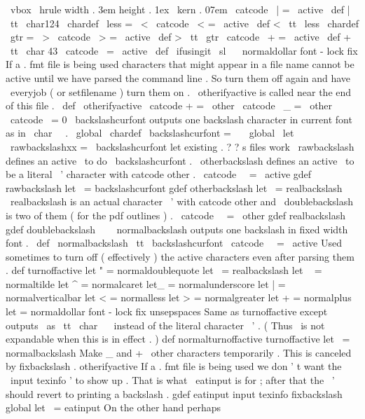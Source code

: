 {{\
vbox
{
\
hrule
width
.
3em
height
.
1ex
}
\
kern
.
07em
}
\
catcode
\
|
=
\
active
\
def
|
{
{
\
tt
\
char124
}
}
\
chardef
\
less
=
\
<
\
catcode
\
<
=
\
active
\
def
<
{
{
\
tt
\
less
}
}
\
chardef
\
gtr
=
\
>
\
catcode
\
>
=
\
active
\
def
>
{
{
\
tt
\
gtr
}
}
\
catcode
\
+
=
\
active
\
def
+
{
{
\
tt
\
char
43
}
}
\
catcode
\
=
\
active
\
def
{
\
ifusingit
{
{
\
sl
\
}
}
\
normaldollar
}
%
font
-
lock
fix
%
If
a
.
fmt
file
is
being
used
characters
that
might
appear
in
a
file
%
name
cannot
be
active
until
we
have
parsed
the
command
line
.
%
So
turn
them
off
again
and
have
\
everyjob
(
or
setfilename
)
turn
them
on
.
%
\
otherifyactive
is
called
near
the
end
of
this
file
.
\
def
\
otherifyactive
{
\
catcode
+
=
\
other
\
catcode
\
_
=
\
other
}
\
catcode
\
=
0
%
\
backslashcurfont
outputs
one
backslash
character
in
current
font
%
as
in
\
char
\
\
.
\
global
\
chardef
\
backslashcurfont
=
\
\
\
global
\
let
\
rawbackslashxx
=
\
backslashcurfont
%
let
existing
.
?
?
s
files
work
%
\
rawbackslash
defines
an
active
\
to
do
\
backslashcurfont
.
%
\
otherbackslash
defines
an
active
\
to
be
a
literal
\
'
character
with
%
catcode
other
.
{
\
catcode
\
\
=
\
active
gdef
rawbackslash
{
let
\
=
backslashcurfont
}
gdef
otherbackslash
{
let
\
=
realbackslash
}
}
%
\
realbackslash
is
an
actual
character
\
'
with
catcode
other
and
%
\
doublebackslash
is
two
of
them
(
for
the
pdf
outlines
)
.
{
\
catcode
\
\
=
\
other
gdef
realbackslash
{
\
}
gdef
doublebackslash
{
\
\
}
}
%
\
normalbackslash
outputs
one
backslash
in
fixed
width
font
.
\
def
\
normalbackslash
{
{
\
tt
\
backslashcurfont
}
}
\
catcode
\
\
=
\
active
%
Used
sometimes
to
turn
off
(
effectively
)
the
active
characters
%
even
after
parsing
them
.
def
turnoffactive
{
%
let
"
=
normaldoublequote
let
\
=
realbackslash
let
~
=
normaltilde
let
^
=
normalcaret
let_
=
normalunderscore
let
|
=
normalverticalbar
let
<
=
normalless
let
>
=
normalgreater
let
+
=
normalplus
let
=
normaldollar
%
font
-
lock
fix
unsepspaces
}
%
Same
as
turnoffactive
except
outputs
\
as
{
\
tt
\
char
\
\
}
instead
of
%
the
literal
character
\
'
.
(
Thus
\
is
not
expandable
when
this
is
in
%
effect
.
)
%
def
normalturnoffactive
{
turnoffactive
let
\
=
normalbackslash
}
%
Make
_
and
+
\
other
characters
temporarily
.
%
This
is
canceled
by
fixbackslash
.
otherifyactive
%
If
a
.
fmt
file
is
being
used
we
don
'
t
want
the
\
input
texinfo
'
to
show
up
.
%
That
is
what
\
eatinput
is
for
;
after
that
the
\
'
should
revert
to
printing
%
a
backslash
.
%
gdef
eatinput
input
texinfo
{
fixbackslash
}
global
let
\
=
eatinput
%
On
the
other
hand
perhaps
}

